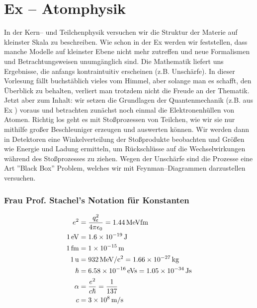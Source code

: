 \documentclass[Ex4_Zusammenfassung.tex]{subfiles}
\begin{document}
\chapter{ Ex  -- Atomphysik}

In der Kern-- und Teilchenphysik versuchen wir die Struktur der Materie auf kleinster Skala zu beschreiben. Wie schon in der Ex  werden wir feststellen, dass manche Modelle auf kleinster Ebene nicht mehr zutreffen und neue Formalismen und Betrachtungsweisen unumgänglich sind. Die Mathematik liefert uns Ergebnisse, die anfangs kontraintuitiv erscheinen (z.B. Unschärfe). In dieser Vorlesung fällt buchstäblich vieles vom Himmel, aber solange man es schafft, den Überblick zu behalten, verliert man trotzdem nicht die Freude an der Thematik.\\

Jetzt aber zum Inhalt: wir setzen die Grundlagen der Quantenmechanik (z.B. aus Ex ) voraus und betrachten zunächst noch einmal die Elektronenhüllen von Atomen. Richtig los geht es mit Stoßprozessen von Teilchen, wie wir sie nur mithilfe großer Beschleuniger erzeugen und auswerten können. Wir werden dann in Detektoren eine Winkelverteilung der Stoßprodukte beobachten und Größen wie Energie und Ladung ermitteln, um Rückschlüsse auf die Wechselwirkungen während des Stoßprozesses zu ziehen. Wegen der Unschärfe sind die Prozesse eine Art ''Black Box'' Problem, welches wir mit Feynman--Diagrammen darzustellen versuchen. 

\subsection*{Frau Prof. Stachel's Notation für Konstanten}
\begin{align*}
	e^2 &= \frac{q_e^2}{4\pi \epsilon_{0}} = \SI{1.44}{MeV fm}  \\
	\SI{1}{eV} &= \SI{1.6E-19}{J}  \\
	\SI{1}{fm} &= \SI{1E-15}{m}\\ 
	\SI{1}{u} &=  \SI{932}{MeV/c^2} = \SI{1.66E-27}{kg} \\
	\hslash &= \SI{6.58E-16}{eV s}= \SI{1.05E-34}{Js} \\
	\alpha &= \frac {e^2}{c \hslash} = \frac{1}{137} \\
	c &= \SI{3E8}{m/s}
\end{align*} 
\end{document}
